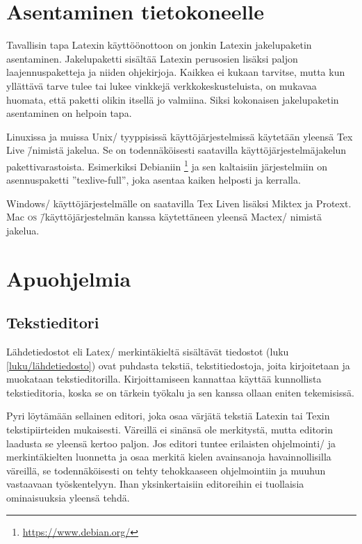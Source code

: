 \section{Asentaminen tietokoneelle}
\label{luku/asentaminen}

Tavallisin tapa Latexin käyttöönottoon on jonkin Latexin jakelupaketin
asentaminen. Jakelupaketti sisältää Latexin perusosien lisäksi paljon
laajennuspaketteja ja niiden ohjekirjoja. Kaikkea ei kukaan tarvitse,
mutta kun yllättävä tarve tulee tai lukee vinkkejä verkkokeskusteluista,
on mukavaa huomata, että paketti olikin itsellä jo valmiina. Siksi
kokonaisen jakelupaketin asentaminen on helpoin tapa.

Linuxissa ja muissa Unix\-/ tyyppisissä käyttöjärjestelmissä käytetään
yleensä Tex Live \=/nimistä jakelua. Se on todennäköisesti saatavilla
käyttöjärjestelmäjakelun pakettivarastoista. Esimerkiksi Debianiin%
\footnote{\url{https://www.debian.org/}} ja sen kaltaisiin järjestelmiin
on asennuspaketti ''texlive-full'', joka asentaa kaiken helposti ja
kerralla.

Windows\-/ käyttöjärjestelmälle on saatavilla Tex Liven lisäksi Miktex
ja Protext. Mac \textsc{os} \=/käyttöjärjestelmän kanssa käytettäneen
yleensä Mactex\-/ nimistä jakelua.

\section{Apuohjelmia}

\subsection{Tekstieditori}

Lähdetiedostot eli Latex\-/ merkintäkieltä sisältävät tiedostot (luku
\ref{luku/lähdetiedosto}) ovat puhdasta tekstiä, tekstitiedostoja, joita
kirjoitetaan ja muokataan tekstieditorilla. Kirjoittamiseen kannattaa
käyttää kunnollista tekstieditoria, koska se on tärkein työkalu ja sen
kanssa ollaan eniten tekemisissä.

Pyri löytämään sellainen editori, joka osaa värjätä tekstiä Latexin tai
Texin tekstipiirteiden mukaisesti. Väreillä ei sinänsä ole merkitystä,
mutta editorin laadusta se yleensä kertoo paljon. Jos editori tuntee
erilaisten ohjelmointi\-/{} ja merkintäkielten luonnetta ja osaa merkitä
kielen avainsanoja havainnollisilla väreillä, se todennäköisesti on
tehty tehokkaaseen ohjelmointiin ja muuhun vastaavaan työskentelyyn.
Ihan yksinkertaisiin editoreihin ei tuollaisia ominaisuuksia yleensä
tehdä.

